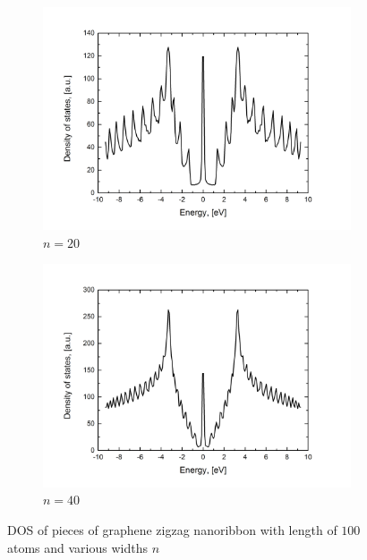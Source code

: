 \begin{figure}[hb!]
\centering
\begin{subfigure}{.45\textwidth}
  \centering
  \includegraphics[width=\linewidth]{img/zz_chain_20_100_dos}
  \caption{$n=20$}
  \label{fig:flake20}
\end{subfigure}%
\begin{subfigure}{.45\textwidth}
  \centering
  \includegraphics[width=\linewidth]{img/zz_chain_40_100_dos}
  \caption{$n=40$}
  \label{fig:flake40}
\end{subfigure}
\caption{DOS of pieces of graphene zigzag nanoribbon with length of $100$ atoms and various widths $n$\label{fig:flake}}
\end{figure}
